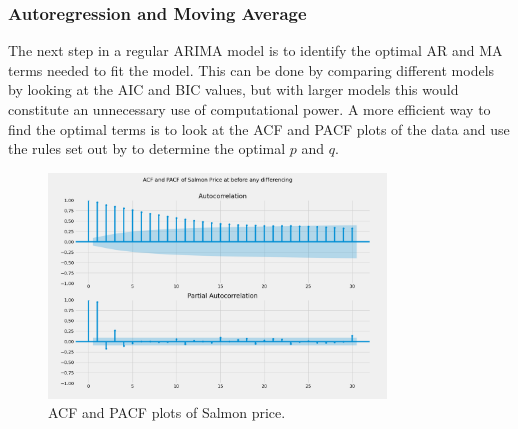 \subsubsection{Autoregression and Moving Average}
The next step in a regular ARIMA model is to identify the optimal AR and MA terms needed to fit the model. This can be done by comparing different models by looking at the AIC and BIC values, but with larger models this would constitute an unnecessary use of computational power. A more efficient way to find the optimal terms is to look at the ACF and PACF plots of the data and use the rules set out by \textcite{nau_2019} to determine the optimal $p$ and $q$. 
\begin{figure}[H]
    \centering
    \includegraphics[width=0.8\textwidth]{data/Figures/ARIMA/OrigACF-PACF_30.png}
    \caption[ACF and PACF plots of Salmon price]{ACF and PACF plots of Salmon price.}\label{fig:Orig_ACF_PACF}
\end{figure}

